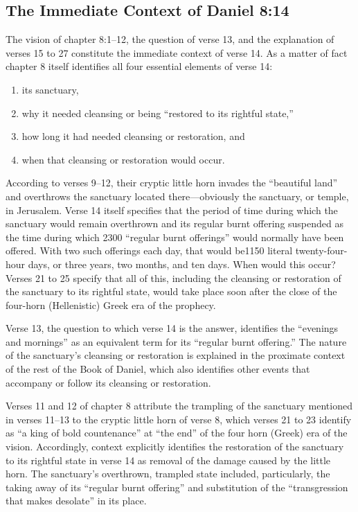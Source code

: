 \subsection{The Immediate Context of Daniel 8:14}

The vision of chapter 8:1--12, the question of verse 13, and the explanation
of verses 15 to 27 constitute the immediate context of verse 14. As a matter
of fact chapter 8 itself identifies all four essential elements of verse 14:
\begin{enumerate}
	\item its sanctuary, 
	\item why it needed cleansing or being ``restored to its
rightful state,'' 
	\item how long it had needed cleansing or restoration, and
	\item when that cleansing or restoration would occur.
\end{enumerate}

According to verses 9--12, their cryptic little horn invades the ``beautiful
land'' and overthrows the sanctuary located there---obviously the sanctuary,
or temple, in Jerusalem. Verse 14 itself specifies that the period of time
during which the sanctuary would remain overthrown and its regular burnt
offering suspended as the time during which 2300 ``regular burnt offerings''
would normally have been offered. With two such offerings each day, that
would be1150 literal twenty-four-hour days, or three years, two months, and
ten days. When would this occur? Verses 21 to 25 specify that all of this,
including the cleansing or restoration of the sanctuary to its rightful
state, would take place soon after the close of the four-horn (Hellenistic)
Greek era of the prophecy.

Verse 13, the question to which verse 14 is the answer, identifies the
``evenings and mornings'' as an equivalent term for its ``regular burnt
offering.'' The nature of the sanctuary's cleansing or restoration is
explained in the proximate context of the rest of the Book of Daniel, which
also identifies other events that accompany or follow its cleansing or
restoration.

Verses 11 and 12 of chapter 8 attribute the trampling of the sanctuary
mentioned in verses 11--13 to the cryptic little horn of verse 8, which
verses 21 to 23 identify as ``a king of bold countenance'' at ``the end'' of the
four horn (Greek) era of the vision. Accordingly, context explicitly
identifies the restoration of the sanctuary to its rightful state in verse
14 as removal of the damage caused by the little horn. The sanctuary's
overthrown, trampled state included, particularly, the taking away of its
``regular burnt offering'' and substitution of the ``transgression that makes
desolate'' in its place.

